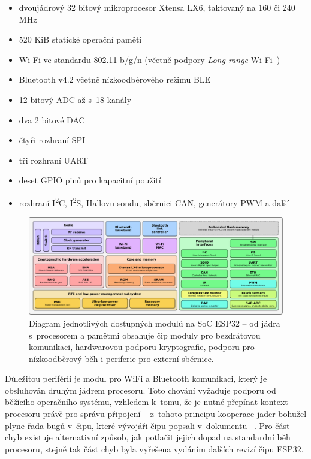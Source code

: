 \begin{itemize}
    \item dvoujádrový 32 bitový mikroprocesor Xtensa LX6, taktovaný na 160 či 240 MHz
    \item 520 KiB statické operační paměti
    \item Wi-Fi ve standardu 802.11 b/g/n (včetně podpory \textit{Long range} Wi-Fi~\cite{Esp32LongRangeWifi})
    \item Bluetooth v4.2 včetně nízkoodběrového režimu BLE
    \item 12 bitový ADC až s~18 kanály
    \item dva 2 bitové DAC
    \item čtyři rozhraní SPI
    \item tři rozhraní UART
    \item deset GPIO pinů pro kapacitní použití
    \item rozhraní I\textsuperscript{2}C, I\textsuperscript{2}S, Hallovu sondu, sběrnici CAN, generátory PWM a další
\end{itemize}

\begin{figure}
    \centering
    \includegraphics[width=\textwidth]{figures/esp-diagram.png}

    \caption{Diagram jednotlivých dostupných modulů na SoC ESP32 -- od jádra s~procesorem a pamětmi obsahuje čip
    moduly pro bezdrátovou komunikaci, hardwarovou podporu kryptografie, podporu pro nízkoodběrový běh i periferie
    pro externí sběrnice.}

    \label{fig:esp-diagram}
\end{figure}

Důležitou periférií je modul pro WiFi a Bluetooth komunikaci, který je obsluhován druhým jádrem procesoru.
Toto chování vyžaduje podporu od běžícího operačního systému, vzhledem k~tomu, že je nutné přepínat kontext procesoru
právě pro správu připojení -- z~tohoto principu kooperace jader bohužel plyne řada bugů v~čipu, které vývojáři čipu
popsali v~dokumentu ~\cite{ESP32KnownBugs}.
Pro část chyb existuje alternativní způsob, jak potlačit jejich dopad na standardní běh procesoru, stejně tak část
chyb byla vyřešena vydáním dalších revizí čipu ESP32.


